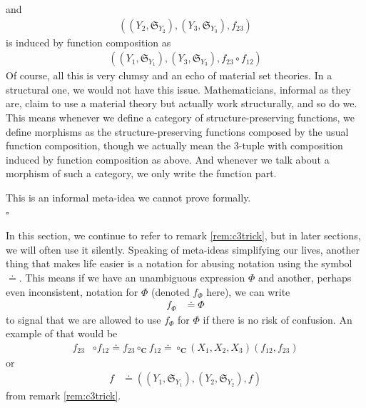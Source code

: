 \begin{rem}[(C3) Trick]
and
\begin{align*}
  \left(
    (Y_{2},\mathfrak{S}_{Y_{2}}),
    (Y_{3},\mathfrak{S}_{Y_{3}}),
    f_{23}
  \right)
\end{align*}
is induced by function composition as
\begin{align*}
  \left(
    (Y_{1},\mathfrak{S}_{Y_{1}}),
    (Y_{3},\mathfrak{S}_{Y_{3}}),
    f_{23}
    \circ
    f_{12}
  \right)
\end{align*}
Of course, all this is very clumsy and an echo of material set theories.
In a structural one, we would not have this issue.
Mathematicians, informal as they are, claim to use a material theory but actually work structurally, and so do we.
This means whenever we define a category of structure-preserving functions, we define morphisms as the structure-preserving functions composed by the usual function composition, though we actually mean the $3$-tuple with composition induced by function composition as above.
And whenever we talk about a morphism of such a category, we only write the function part.
\end{rem}
\begin{prf}
This is an informal meta-idea we cannot prove formally.
\\
\phantom{proven}
\hfill
$\square$
\end{prf}
In this section, we continue to refer to remark \ref{rem:c3trick}, but in later sections, we will often use it silently.
Speaking of meta-ideas simplifying our lives, another thing that makes life easier is a notation for {\glqq}abusing notation{\grqq} using the symbol $\doteq$.
This means if we have an unambiguous expression $\Phi$ and another, perhaps even inconsistent, notation for $\Phi$ (denoted $f_{\Phi}$ here), we can write
\begin{align*}
  f_{\Phi}
  &\doteq
  \Phi
\end{align*}
to signal that we are allowed to use $f_{\Phi}$ for $\Phi$ if there is no risk of confusion.
An example of that would be
\begin{align*}
  f_{23}
  &\circ
  f_{12}
  \doteq
  f_{23}
  \circ_{\mathbf{C}}
  f_{12}
  \doteq
  \circ_{\mathbf{C}}(X_{1},X_{2},X_{3})(f_{12},f_{23})
\end{align*}
or
\begin{align*}
  f
  &\doteq
  \left(
    (Y_{1},\mathfrak{S}_{Y_{1}}),
    (Y_{2},\mathfrak{S}_{Y_{2}}),
    f
  \right)
\end{align*}
from remark \ref{rem:c3trick}.
\\\\

